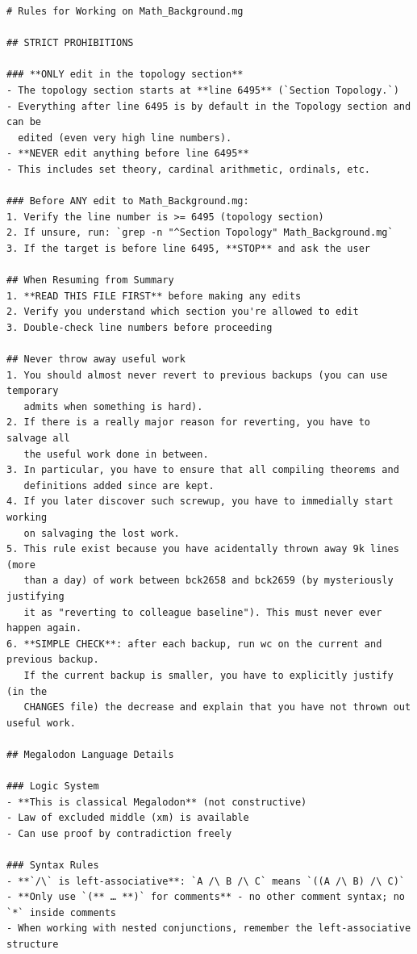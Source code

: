 \documentclass[a4paper,UKenglish,cleveref, autoref, thm-restate]{lipics-v2021}
\begin{document}
\begin{small}
\begin{verbatim}
# Rules for Working on Math_Background.mg

## STRICT PROHIBITIONS

### **ONLY edit in the topology section**
- The topology section starts at **line 6495** (`Section Topology.`)
- Everything after line 6495 is by default in the Topology section and can be
  edited (even very high line numbers).
- **NEVER edit anything before line 6495**
- This includes set theory, cardinal arithmetic, ordinals, etc.

### Before ANY edit to Math_Background.mg:
1. Verify the line number is >= 6495 (topology section)
2. If unsure, run: `grep -n "^Section Topology" Math_Background.mg`
3. If the target is before line 6495, **STOP** and ask the user

## When Resuming from Summary
1. **READ THIS FILE FIRST** before making any edits
2. Verify you understand which section you're allowed to edit
3. Double-check line numbers before proceeding

## Never throw away useful work
1. You should almost never revert to previous backups (you can use temporary
   admits when something is hard).
2. If there is a really major reason for reverting, you have to salvage all
   the useful work done in between.
3. In particular, you have to ensure that all compiling theorems and
   definitions added since are kept.
4. If you later discover such screwup, you have to immedially start working
   on salvaging the lost work.
5. This rule exist because you have acidentally thrown away 9k lines (more
   than a day) of work between bck2658 and bck2659 (by mysteriously justifying
   it as "reverting to colleague baseline"). This must never ever happen again.
6. **SIMPLE CHECK**: after each backup, run wc on the current and previous backup.
   If the current backup is smaller, you have to explicitly justify (in the
   CHANGES file) the decrease and explain that you have not thrown out useful work.

## Megalodon Language Details

### Logic System
- **This is classical Megalodon** (not constructive)
- Law of excluded middle (xm) is available
- Can use proof by contradiction freely

### Syntax Rules
- **`/\` is left-associative**: `A /\ B /\ C` means `((A /\ B) /\ C)`
- **Only use `(** … **)` for comments** - no other comment syntax; no `*` inside comments
- When working with nested conjunctions, remember the left-associative structure


\end{verbatim}
\end{small}
\end{document}

